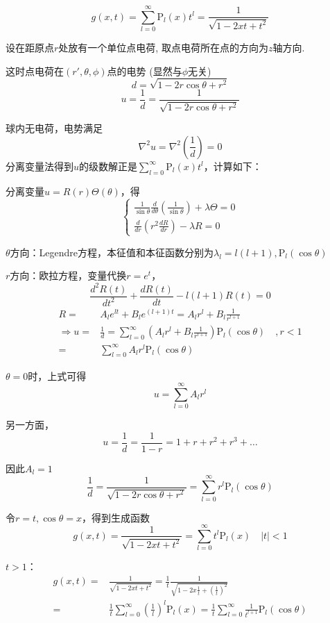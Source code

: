\begin{nex}
$$
g(x,t)=\sum_{l=0}^\infty \mathrm{P}_l(x)t^l=\frac{1}{\sqrt{1-2xt+t^2}}
$$

设在距原点$r$处放有一个单位点电荷, 取点电荷所在点的方向为$z$轴方向.

这时点电荷在$(r',\theta,\phi)$点的电势 (显然与$\phi$无关) 
$$d=\sqrt{1-2r\cos\theta+r^2}$$
$$u=\frac{1}{d}=\frac{1}{\sqrt{1-2r\cos\theta+r^2}}$$

球内无电荷，电势满足
$$\nabla^2u=\nabla^2\left(\frac{1}{d}\right)=0$$
分离变量法得到$u$的级数解正是$\sum_{l=0}^\infty \mathrm{P}_l(x)t^l$，计算如下：

分离变量$u=R(r)\Theta(\theta)$，得
$$
\begin{cases}
   \frac{1}{ \sin\theta}\frac{d}{d\theta}\left(\frac{1}{\sin\theta}\right)+\lambda\Theta=0\\
   \frac{d}{dr}\left(r^2\frac{dR}{dr}\right)-\lambda R=0
\end{cases}
$$

$\theta$方向：Legendre方程，本征值和本征函数分别为$\lambda_l=l(l+1),\mathrm{P}_l(\cos\theta)$

$r$方向：欧拉方程，变量代换$r=e^t$，
$$
\frac{d^2R(t)}{dt^2}+\frac{dR(t)}{dt}-l(l+1)R(t)=0
$$
$$\begin{aligned}
R=&A_le^{lt}+B_le^{(l+1)t}=A_lr^l+B_l\frac{1}{r^{l+1}}\\
\Rightarrow u=&\frac{1}{d}=\sum_{l=0}^\infty\left(A_lr^l+B_l\frac{1}{r^{l+1}}\right)\mathrm{P}_l(\cos\theta)\quad,r<1\\
=&\sum_{l=0}^\infty A_lr^l\mathrm{P}_l(\cos\theta)
\end{aligned}$$

$\theta=0$时，上式可得$$u=\sum_{l=0}^\infty A_lr^l$$

另一方面，
$$u=\frac{1}{d}=\frac{1}{1-r}=1+r+r^2+r^3+\dots$$

因此$A_l=1$
$$
\frac{1}{d}=\frac{1}{\sqrt{1-2r\cos\theta+r^2}}=\sum_{l=0}^\infty r^l\mathrm{P}_l(\cos\theta)
$$

令$r=t,\cos\theta=x$，得到生成函数
$$\boxed{g(x,t)=\frac{1}{\sqrt{1-2xt+t^2}}=\sum_{l=0}^\infty t^l\mathrm{P}_l(x)\quad|t|<1}$$

$t>1$：
$$
\begin{aligned}
g(x,t)=&\frac{1}{\sqrt{1-2xt+t^2}}=\frac{1}{t}\frac{1}{\sqrt{1-2x\frac{1}{t}+\left(\frac{1}{t}\right)^2}}\\
=&\frac{1}{t}\sum_{l=0}^\infty\left(\frac{1}{l}\right)^l\mathrm{P}_l(x)=\frac{1}{t}\sum_{l=0}^\infty\frac{1}{t^{l+1}}\mathrm{P}_l(\cos\theta)
\end{aligned}$$

\end{nex}
